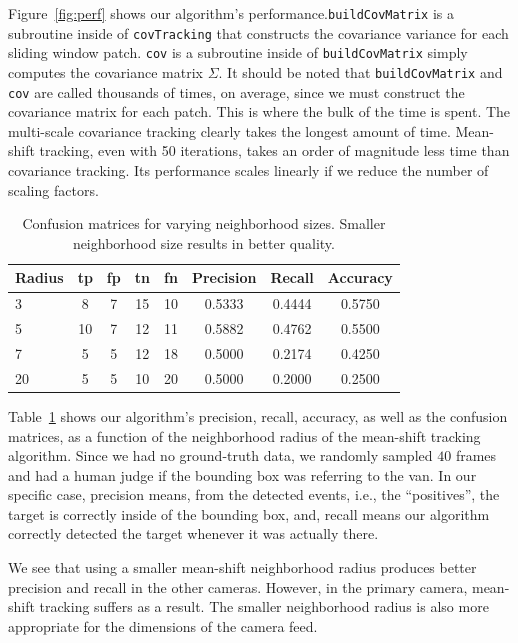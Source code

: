 \documentclass{article}
\begin{document}
Figure~\ref{fig:perf} shows our algorithm's performance.\texttt{buildCovMatrix} is a subroutine inside of \texttt{covTracking} that constructs the covariance variance for each sliding window patch. \texttt{cov} is a subroutine inside of \texttt{buildCovMatrix} simply computes the covariance matrix $\Sigma$. It should be noted that \texttt{buildCovMatrix} and \texttt{cov} are called thousands of times, on average, since we must construct the covariance matrix for each patch. This is where the bulk of the time is spent. The multi-scale covariance tracking clearly takes the longest amount of time. Mean-shift tracking, even with 50 iterations, takes an order of magnitude less time than covariance tracking. Its performance scales linearly if we reduce the number of scaling factors.

\begin{table}[t]
\centering
\begin{tabular}{lccccccc}
\toprule
\textbf{Radius} & \textbf{tp} & \textbf{fp} & \textbf{tn} & \textbf{fn} & \textbf{Precision} & \textbf{Recall} & \textbf{Accuracy} \\
\midrule
3 & 8 & 7 & 15 & 10 & 0.5333 & 0.4444 & 0.5750\\
5 & 10 & 7 & 12 & 11 & 0.5882 & 0.4762 & 0.5500\\
7 & 5 & 5 & 12 & 18 & 0.5000 & 0.2174 & 0.4250\\
20 & 5 & 5 & 10 & 20 & 0.5000 & 0.2000 & 0.2500\\
\bottomrule
\end{tabular}
\caption{Confusion matrices for varying neighborhood sizes. Smaller neighborhood size results in better quality.}\label{fig:accuracy}
\end{table}

Table~\ref{fig:accuracy} shows our algorithm's precision, recall, accuracy, as well as the confusion matrices, as a function of the neighborhood radius of the mean-shift tracking algorithm. Since we had no ground-truth data, we randomly sampled $40$ frames and had a human judge if the bounding box was referring to the van. In our specific case, precision means, from the detected events, i.e., the ``positives'', the target is correctly inside of the bounding box, and, recall means our algorithm correctly detected the target whenever it was actually there.

We see that using a smaller mean-shift neighborhood radius produces better precision and recall in the other cameras. However, in the primary camera, mean-shift tracking suffers as a result. The smaller neighborhood radius is also more appropriate for the dimensions of the camera feed.
\end{document}
